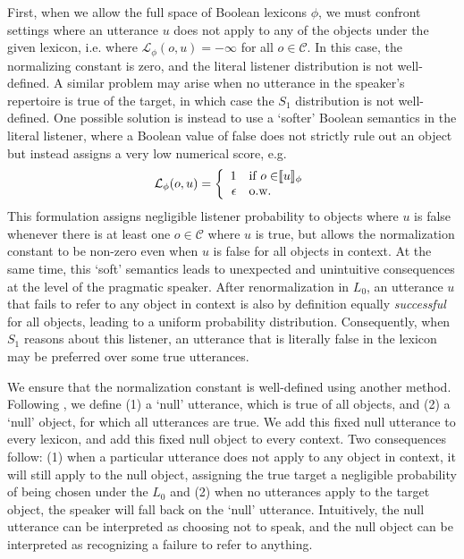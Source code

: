 \documentclass[11pt, floatsintext]{apa6}
\newcommand{\den}[1]{\ensuremath{\llbracket #1 \rrbracket}}
\begin{document}
First, when we allow the full space of Boolean lexicons $\phi$, we must confront settings where an utterance $u$ does not apply to any of the objects under the given lexicon, i.e. where $\mathcal{L}_\phi(o, u) = -\infty$ for all $o\in \mathcal{C}$. 
In this case, the normalizing constant is zero, and the literal listener distribution is not well-defined.
A similar problem may arise when no utterance in the speaker's repertoire is true of the target, in which case the $S_1$ distribution is not well-defined.
One possible solution is instead to use a `softer' Boolean semantics in the literal listener, where a Boolean value of false does not strictly rule out an object but instead assigns a very low numerical score, e.g. 
$$\mathcal{L}_\phi(o,u) = \left\{ \begin{array} {rl} 1 & \textrm{if $o \in $\den{u}$_\phi$} \\ \epsilon & \textrm{o.w.} \end{array}\right.$$
This formulation assigns negligible listener probability to objects where $u$ is false whenever there is at least one $o\in\mathcal{C}$ where $u$ is true, but allows the normalization constant to be non-zero even when $u$ is false for all objects in context.
At the same time, this `soft' semantics leads to unexpected and unintuitive consequences at the level of the pragmatic speaker. 
After renormalization in $L_0$, an utterance $u$ that fails to refer to any object in context is also by definition equally \emph{successful} for all objects, leading to a uniform probability distribution.
Consequently, when $S_1$ reasons about this listener, an utterance that is literally false in the lexicon may be preferred over some true utterances.

We ensure that the normalization constant is well-defined  using another method.
Following , we define (1) a `null' utterance, which is true of all objects, and (2) a `null' object, for which all utterances are true. 
We add this fixed null utterance to every lexicon, and add this fixed null object to every context.
Two consequences follow: (1) when a particular utterance does not apply to any object in context, it will still apply to the null object, assigning the true target a negligible probability of being chosen under the $L_0$ and (2) when no utterances apply to the target object, the speaker will fall back on the `null' utterance.
Intuitively, the null utterance can be interpreted as choosing not to speak, and the null object can be interpreted as recognizing a failure to refer to anything.
\end{document}
